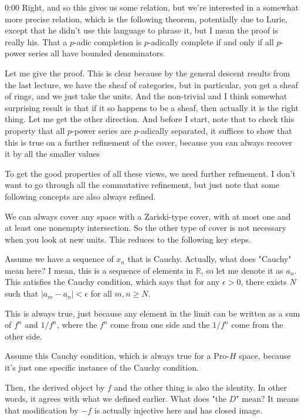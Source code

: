 \begin{unfinished}{0:00}
Right, and so this gives us some relation, but we're interested in a somewhat more precise relation, which is the following theorem, potentially due to Lurie, except that he didn't use this language to phrase it, but I mean the proof is really his. That a $p$-adic completion is $p$-adically complete if and only if all $p$-power series all have bounded denominators. 

Let me give the proof. This is clear because by the general descent results from the last lecture, we have the sheaf of categories, but in particular, you get a sheaf of rings, and we just take the units. And the non-trivial and I think somewhat surprising result is that if it so happens to be a sheaf, then actually it is the right thing. Let me get the other direction. And before I start, note that to check this property that all $p$-power series are $p$-adically separated, it suffices to show that this is true on a further refinement of the cover, because you can always recover it by all the smaller values

To get the good properties of all these views, we need further refinement. I don't want to go through all the commutative refinement, but just note that some following concepts are also always refined.

We can always cover any space with a Zariski-type cover, with at most one and at least one nonempty intersection. So the other type of cover is not necessary when you look at new units. This reduces to the following key steps.

Assume we have a sequence of $x_n$ that is Cauchy. Actually, what does "Cauchy" mean here? I mean, this is a sequence of elements in $\mathbb{R}$, so let me denote it as $a_n$. This satisfies the Cauchy condition, which says that for any $\epsilon > 0$, there exists $N$ such that $|a_m - a_n| < \epsilon$ for all $m, n \geq N$. 

This is always true, just because any element in the limit can be written as a sum of $f^n$ and $1/f^n$, where the $f^n$ come from one side and the $1/f^n$ come from the other side.

Assume this Cauchy condition, which is always true for a Pro-$H$ space, because it's just one specific instance of the Cauchy condition.

Then, the derived object by $f$ and the other thing is also the identity. In other words, it agrees with what we defined earlier. What does "the $D$" mean? It means that modification by $-f$ is actually injective here and has closed image.


\end{unfinished}
